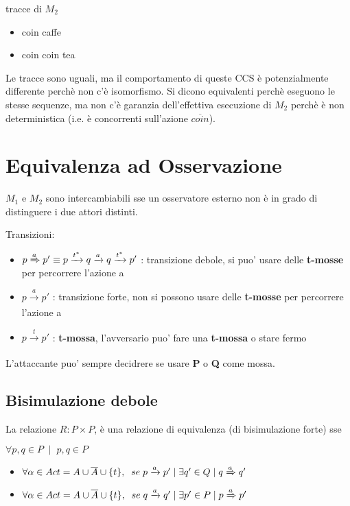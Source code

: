 tracce di $M_2$
\begin{itemize}
  \item coin caffe
  \item coin coin tea
\end{itemize}

Le tracce sono uguali, ma il comportamento di queste CCS \`e potenzialmente differente perch\`e non c'\`e isomorfismo. Si dicono equivalenti perch\`e eseguono le stesse sequenze, ma non c'\`e garanzia dell'effettiva esecuzione di $M_2$ perch\`e \`e non deterministica (i.e. \`e concorrenti sull'azione $\overline {coin}$).

\section{Equivalenza ad Osservazione}

$M_1$ e $M_2$ sono intercambiabili sse un osservatore esterno non \`e in grado di distinguere i due attori distinti.

Transizioni:
\begin{itemize}
  \item $p \xRightarrow[]{a} p' \equiv p \xrightarrow[]{t^\ast} q  \xrightarrow[]{a} q  \xrightarrow[]{t^\ast} p'$ : transizione debole, si puo' usare delle \textbf{t-mosse} per percorrere l'azione a
  \item $p \xrightarrow[]{a} p'$ : transizione forte, non si possono usare delle \textbf{t-mosse} per percorrere l'azione a
  \item $p \xrightarrow[]{t} p'$ : \textbf{t-mossa}, l'avversario puo' fare una \textbf{t-mossa} o stare fermo
\end{itemize}

  L'attaccante puo' sempre decidrere se usare \textbf{P} o \textbf{Q} come mossa.

\subsection{Bisimulazione debole}

La relazione $R : P \times P$,  \`e una relazione di equivalenza (di bisimulazione forte) sse

$\forall p,q \in P \;\; | \;\; p,q \in P$ 

\begin{itemize}
  \item $\forall \alpha \in Act = A \cup \overline A \cup \{t\}, \;\; se \; p \xrightarrow[]{a} p' \; | \; \exists q' \in Q \; | \; q \xRightarrow[]{a} q'$
  \item $\forall \alpha \in Act = A \cup \overline A \cup \{t\}, \;\; se \; q \xrightarrow[]{a} q' \; | \; \exists p' \in P \; | \; p \xRightarrow[]{a} p'$
\end{itemize}

